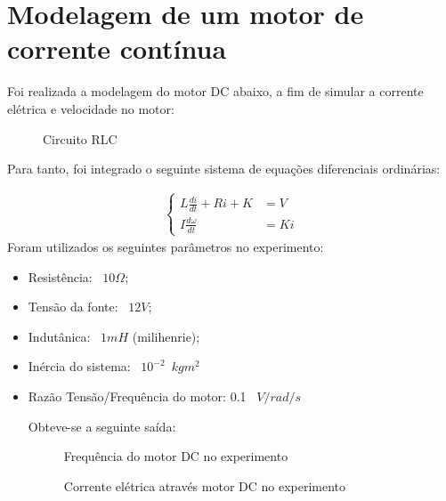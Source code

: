 \documentclass[fleqn, 11pt]{article}
\begin{document}
\newpage
\section{Modelagem de um motor de corrente contínua}
Foi realizada a modelagem do motor DC abaixo, a fim de simular a corrente elétrica e velocidade no motor:
\begin{figure}[H]
\label{figure:circuito_2}
   \caption{Circuito RLC}
\end{figure}
Para tanto, foi integrado o seguinte sistema de equações diferenciais ordinárias:

\begin{align*}
\left\{\begin{matrix}
L \frac{di}{dt} + Ri + K & = V \\
I \frac{d \omega}{dt} &= Ki
\end{matrix}\right.
\end{align*}
Foram utilizados os seguintes parâmetros no experimento:


\begin{itemize}
\item Resistência: $\phantom{0} 10 \Omega$;
\item Tensão da fonte: $\phantom{0} 12 V$;
\item Indutânica: $\phantom{0} 1 mH$ (milihenrie);
\item Inércia do sistema: $\phantom{0} 10^{-2}\phantom{0} kg m^2$
\item Razão Tensão/Frequência do motor: 0.1 $\phantom{0} V/rad/s$

Obteve-se a seguinte saída:

\begin{figure}[H]
\label{figure:circuito_2}
   \caption{Frequência do motor DC no experimento}
\end{figure}

\begin{figure}[H]
\label{figure:circuito_2}
   \caption{Corrente elétrica através motor DC no experimento}
\end{figure}

\end{itemize}
\end{document}
